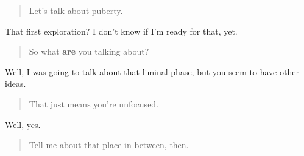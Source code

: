 \begin{quote}
Let's talk about puberty.
\end{quote}

That first exploration? I don't know if I'm ready for that, yet.

\begin{quote}
So what \textbf{are} you talking about?
\end{quote}

Well, I was going to talk about that liminal phase, but you seem to have other ideas.

\begin{quote}
That just means you're unfocused.
\end{quote}

Well, yes.

\begin{quote}
Tell me about that place in between, then.
\end{quote}
